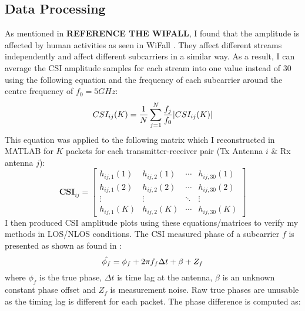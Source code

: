 \subsection{Data Processing}
As mentioned in \textbf{REFERENCE THE WIFALL}, I found that the amplitude is affected by human activities as seen in WiFall \citep{WiFall}. They affect different streams independently and affect different subcarriers in a similar way. As a result, I can average the CSI amplitude samples for each stream into one value instead of 30 using the following equation and the frequency of each subcarrier around the centre frequency of $f_0 = 5GHz$:
\vspace{-11pt}
\begin{equation}\label{eqn:3.1}
    CSI_{ij}(K) = \frac{1}{N} \sum_{j=1}^{N} \frac{f_j}{f_0} |CSI_{ij}(K)|
    \vspace{-11pt}
\end{equation}
This equation was applied to the following matrix which I reconstructed in MATLAB for $K$ packets for each transmitter-receiver pair (Tx Antenna $i$ \& Rx antenna $j$):
\vspace{-33pt}
\begin{equation}\label{eqn:3.2}
\textbf{CSI}_{ij}=\left[
\begin{array}{cccc}
    h_{ij,1}(1) & h_{ij,2}(1) & \cdots & h_{ij,30}(1) \\
    h_{ij,1}(2) & h_{ij,2}(2) & \cdots & h_{ij,30}(2) \\
   \vdots & \vdots & \ddots & \vdots \\
    h_{ij,1}(K) & h_{ij,2}(K) & \cdots & h_{ij,30}(K) 
\end{array}
\right]
\end{equation}
I then produced CSI amplitude plots using these equations/matrices to verify my methods in LOS/NLOS conditions. The CSI measured phase of a subcarrier $f$ is presented as shown as found in \cite{MonaLisaSpotFi}:
\vspace{-11pt}
\begin{equation}\label{eqn:3.3}
    \hat{\phi_f} = \phi_{f}+2\pi f_{f}\Delta t + \beta + Z_f
    \vspace{-11pt}
\end{equation}
where $\phi_{f}$ is the true phase, $\Delta t$ is time lag at the antenna, $\beta$ is an unknown constant phase offset and $Z_f$ is measurement noise. Raw true phases are unusable as the timing lag is different for each packet. The phase difference is computed as:
\vspace{-11pt}
